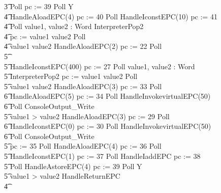 \begin{figure}[t!]
\begin{circus}
    \t3 Poll \circseq pc := 39 \circseq Poll \circseq \circmu Y \circspot \\
    \t4 HandleAloadEPC(4) \circseq pc := 40 \circseq Poll \circseq HandleIconstEPC(10) \circseq pc := 41 \circseq \\
    \t4 Poll \circseq \circvar value1, value2 : Word \circspot InterpreterPop2 \circseq \\
    \t4 pc := \IF value1 \leq value2   \circseq Poll \circseq \\
    \t4 \circif value1 \leq value2 \circthen HandleAloadEPC(2) \circseq pc := 22 \circseq Poll \circseq \\
    \t5 {} \cdots {} \\
    \t5 HandleIconstEPC(400) \circseq pc := 27 \circseq Poll \circseq \circvar value1, value2 : Word \circspot \\
    \t5 InterpreterPop2 \circseq pc := \IF value1 \leq value2   \circseq Poll \circseq \\
    \t5 \circif value1 \leq value2 \circthen HandleAloadEPC(3) \circseq pc := 33 \circseq Poll \circseq \\
    \t6 HandleAloadEPC(5) \circseq pc := 34 \circseq Poll \circseq HandleInvokevirtualEPC(50) \circseq \\
    \t6 Poll \circseq ConsoleOutput\_Write \\
    \t5 {} \circelse value1 > value2 \circthen HandleAloadEPC(3) \circseq pc := 29 \circseq Poll \circseq \\
    \t6  HandleIconstEPC(0) \circseq pc := 30 \circseq  Poll \circseq HandleInvokevirtualEPC(50) \circseq \\
    \t6 Poll \circseq ConsoleOutput\_Write \\
    \t5 \circfi \circseq pc := 35 \circseq Poll \circseq  HandleAloadEPC(4) \circseq pc := 36 \circseq Poll \circseq \\
    \t5 HandleIconstEPC(1) \circseq pc := 37 \circseq Poll \circseq HandleIaddEPC \circseq pc := 38 \circseq \\
    \t5 Poll \circseq HandleAstoreEPC(4) \circseq pc := 39 \circseq Poll \circseq Y \\
    \t5 {} \circelse value1 > value2 \circthen  HandleReturnEPC \\
    \t4 \circfi \\

\end{circus}
\end{figure}
